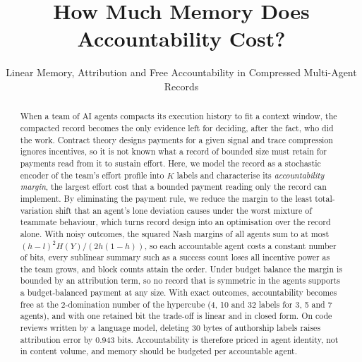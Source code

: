 \documentclass[sigconf,anonymous,acmthm=false]{acmart}
\theoremstyle{acmplain}
\theoremstyle{acmdefinition}
\begin{document}
\title{How Much Memory Does Accountability Cost?}
\subtitle{Linear Memory, Attribution and Free Accountability in Compressed Multi-Agent Records}

\begin{abstract}
When a team of AI agents compacts its execution history to fit a context window, the
compacted record becomes the only evidence left for deciding, after the fact, who did the
work. Contract theory designs payments for a given signal and trace compression ignores
incentives, so it is not known what a record of bounded size must retain for payments read
from it to sustain effort. Here, we model the record as a stochastic encoder of the team's
effort profile into $K$ labels and characterise its \emph{accountability margin}, the
largest effort cost that a bounded payment reading only the record can implement. By
eliminating the payment rule, we reduce the margin to the least total-variation shift that
an agent's lone deviation causes under the worst mixture of teammate behaviour, which turns
record design into an optimisation over the record alone. With noisy outcomes, the squared
Nash margins of all agents sum to at most $(h-l)^2H(Y)/(2h(1-h))$, so each accountable agent
costs a constant number of bits, every sublinear summary such as a success count loses all
incentive power as the team grows, and block counts attain the order. Under budget balance
the margin is bounded by an attribution term, so no record that is symmetric in the agents
supports a budget-balanced payment at any size. With exact outcomes, accountability becomes
free at the 2-domination number of the hypercube (4, 10 and 32 labels for 3, 5 and 7
agents), and with one retained bit the trade-off is linear and in closed form. On code
reviews written by a language model, deleting 30 bytes of authorship labels raises
attribution error by 0.943 bits. Accountability is therefore priced in agent identity,
not in content volume, and memory should be budgeted per accountable agent.
\end{abstract}


\maketitle

\end{document}
